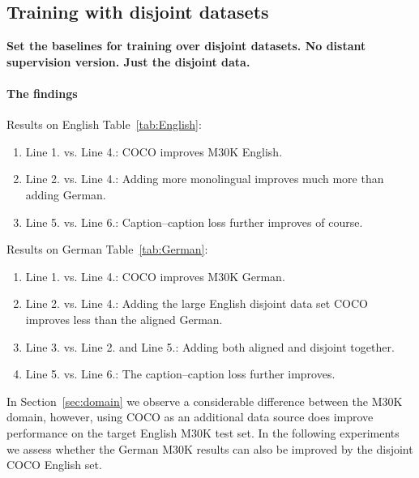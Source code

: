 \subsection{Training with disjoint datasets}
\textbf{Set the baselines for training over disjoint datasets. No distant supervision version. Just the disjoint data.}

\paragraph{The findings}
Results on English Table~\ref{tab:English}:
\begin{enumerate}
    \item Line 1. vs. Line 4.: COCO improves M30K English.
    \item Line 2. vs. Line 4.: Adding more monolingual improves much more than
    adding German.
    \item Line 5. vs. Line 6.: Caption--caption loss further improves of course.
\end{enumerate}

Results on German Table~\ref{tab:German}:
\begin{enumerate}
    \item Line 1. vs. Line 4.: COCO improves M30K German.
    \item Line 2. vs. Line 4.: Adding the large English disjoint data set COCO 
    improves less than the aligned German.
    \item Line 3. vs. Line 2. and Line 5.: Adding both aligned and disjoint 
    together.
    \item Line 5. vs. Line 6.: The caption--caption loss further improves.
\end{enumerate}

In Section~\ref{sec:domain} we observe a considerable difference between the 
M30K domain, however, using COCO as an additional data source does improve 
performance on the target English M30K test set. In the following experiments
we assess whether the German M30K results can also be improved by the disjoint
COCO English set.

